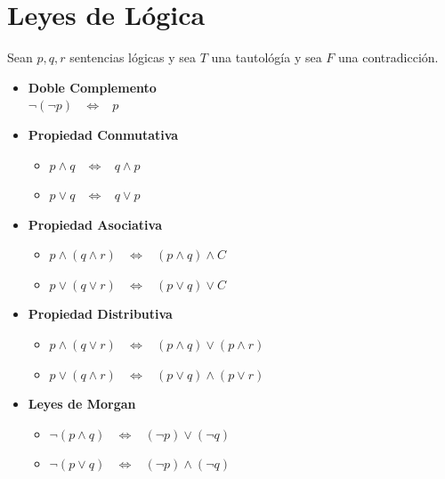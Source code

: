 \documentclass[12pt, fleqn]{report}                             %
\DeclareMathOperator \Space     {\quad}                         %
\DeclareMathOperator \MiniSpace {\;}                            %
\theoremstyle{break}                                            %
\newcommand \lEqual  {\MiniSpace \Leftrightarrow \MiniSpace}    %
\begin{document}
        \clearpage
        \section{Leyes de Lógica}
                    
                Sean $p, q, r$ sentencias lógicas y sea $T$ una tautológía y sea $F$ una contradicción.

                \begin{itemize}
                    \item \textbf{Doble Complemento} \\
                            $\lnot(\lnot p) \lEqual p$

                    \item \textbf{Propiedad Conmutativa}
                        \begin{itemize}
                            \item $p \land q \lEqual q \land p$
                            \item $p \lor  q \lEqual q \lor  p$
                        \end{itemize}

                    \item \textbf{Propiedad Asociativa}
                        \begin{itemize}
                            \item $p \land (q \land r) \lEqual (p \land q) \land C$
                            \item $p \lor (q \lor r) \lEqual (p \lor q) \lor C$
                        \end{itemize}

                    \item \textbf{Propiedad Distributiva}
                        \begin{itemize}
                            \item $p \land (q \lor r) \lEqual (p \land q) \lor (p \land r)$
                            \item $p \lor (q \land r) \lEqual (p \lor q) \land (p \lor r)$
                        \end{itemize}

                    \item \textbf{Leyes de Morgan}
                        \begin{itemize}
                            \item $\lnot (p \land q) \lEqual (\lnot p) \lor (\lnot q)$
                            \item $\lnot (p \lor q) \lEqual (\lnot p) \land (\lnot q)$
                        \end{itemize}


\end{itemize}
\end{document}
